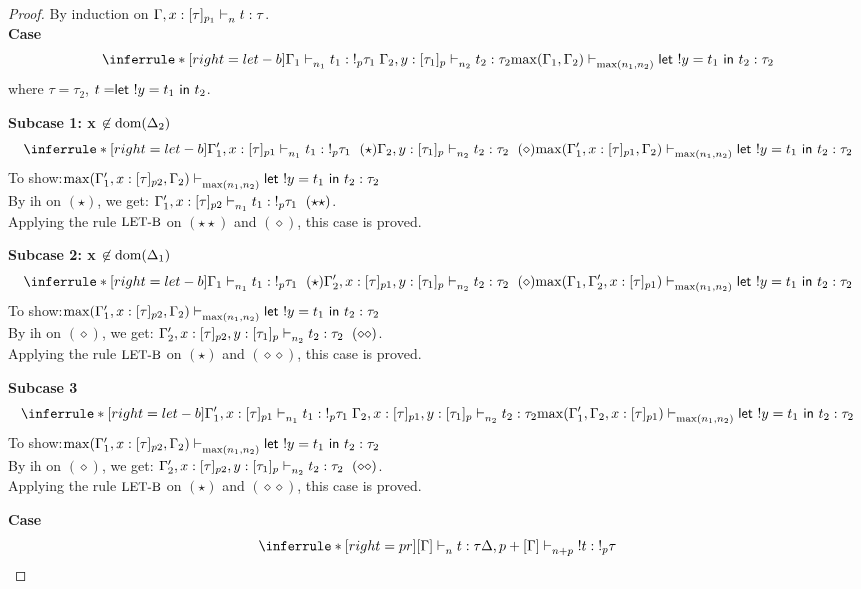 \documentclass{article}
\begin{document}
\begin{proof}
  By induction on $\Gamma, x:[\tau]_{p_1} \mathrel{\vdash_{n}^{} {t} : {\tau}}  $.\\
\noindent \textbf{Case} 
\[
   \inferrule*[ right = let-b ]
   {\Gamma_1 \jtype{n_1}{}{t_1}{!_p \tau_1} \\ \Gamma_2, y: [\tau_1]_p \jtype{n_2}{}{t_2}{\tau_2}}
   { \max(\Gamma_1, \Gamma_2)  \jtype{\max(n_1,n_2)}{}{\letx{!y}{t_1}{t_2}}{\tau_2}  }
\]
where $\tau = \tau_2$, $t = \mathrel{ \mathsf{let}\ {!y} = {t_1} \ \mathsf{in} \ {t_2} }$.

\textbf{Subcase 1: x $\not \in \text{dom}(\Delta_2)$ }
\[
   \inferrule*[ right = let-b ]
   {\Gamma_1', x:[\tau]_{p1} \jtype{n_1}{}{t_1}{!_p \tau_1}~(\star) \\
   \Gamma_2, y: [\tau_1]_p \jtype{n_2}{}{t_2}{\tau_2}~(\diamond)}
   { \max(\Gamma_1', x:[\tau]_{p1} , \Gamma_2)  \jtype{\max(n_1,n_2)}{}{\letx{!y}{t_1}{t_2}}{\tau_2}  }
\]
To show:$\max(\Gamma_1', x:[\tau]_{p2} , \Gamma_2)  \mathrel{\vdash_{\max(n_1,n_2)}^{} {\mathrel{ \mathsf{let}\ {!y} = {t_1} \ \mathsf{in} \ {t_2} }} : {\tau_2}}$\\
By ih on $(\star)$, we get: $\Gamma_1', x:[\tau]_{p2} \jtype{n_1}{}{t_1}{!_p \tau_1}~(\star\star)$.\\
Applying the rule $\mbox{\small{LET-B}}$ on $(\star\star)$ and $(\diamond)$, this case is proved.

\textbf{Subcase 2: x $\not \in \text{dom}(\Delta_1)$ }
\[
   \inferrule*[ right = let-b ]
   {
   \Gamma_1 \jtype{n_1}{}{t_1}{!_p \tau_1}~(\star) \\
   \Gamma_2', x:[\tau]_{p1}, y: [\tau_1]_p \jtype{n_2}{}{t_2}{\tau_2}~(\diamond)
   }
   { 
   \max(\Gamma_1 , \Gamma_2', x:[\tau]_{p1})  \jtype{\max(n_1,n_2)}{}{\letx{!y}{t_1}{t_2}}{\tau_2}  
   }
\]
To show:$\max(\Gamma_1', x:[\tau]_{p2} , \Gamma_2)  \mathrel{\vdash_{\max(n_1,n_2)}^{} {\mathrel{ \mathsf{let}\ {!y} = {t_1} \ \mathsf{in} \ {t_2} }} : {\tau_2}}$\\
By ih on $(\diamond)$, we get: $\Gamma_2', x:[\tau]_{p2}, y: [\tau_1]_p \mathrel{\vdash_{n_2}^{} {t_2} : {\tau_2}}~(\diamond\diamond)$.\\
Applying the rule $\mbox{\small{LET-B}}$ on $(\star)$ and $(\diamond\diamond)$, this case is proved.


\textbf{Subcase 3}
\[
   \inferrule*[ right = let-b ]
   {\Gamma_1', x:[\tau]_{p1} \jtype{n_1}{}{t_1}{!_p \tau_1} \\ \Gamma_2, x:[\tau]_{p1}, y: [\tau_1]_p \jtype{n_2}{}{t_2}{\tau_2}}
   { \max(\Gamma_1', \Gamma_2, x:[\tau]_{p1})  \jtype{\max(n_1,n_2)}{}{\letx{!y}{t_1}{t_2}}{\tau_2}  }
\]
To show:$\max(\Gamma_1', x:[\tau]_{p2} , \Gamma_2)  \mathrel{\vdash_{\max(n_1,n_2)}^{} {\mathrel{ \mathsf{let}\ {!y} = {t_1} \ \mathsf{in} \ {t_2} }} : {\tau_2}}$\\
By ih on $(\diamond)$, we get: $\Gamma_2', x:[\tau]_{p2}, y: [\tau_1]_p \mathrel{\vdash_{n_2}^{} {t_2} : {\tau_2}}~(\diamond\diamond)$.\\
Applying the rule $\mbox{\small{LET-B}}$ on $(\star)$ and $(\diamond\diamond)$, this case is proved.


\noindent \textbf{Case} 
\[
   \inferrule*[right = pr]
   {[\Gamma] \jtype{n}{}{t}{\tau}}
   {\Delta, p + [\Gamma] \jtype{n+p}{}{!t}{!_p \tau}  }
\]

\end{proof}
\end{document}
